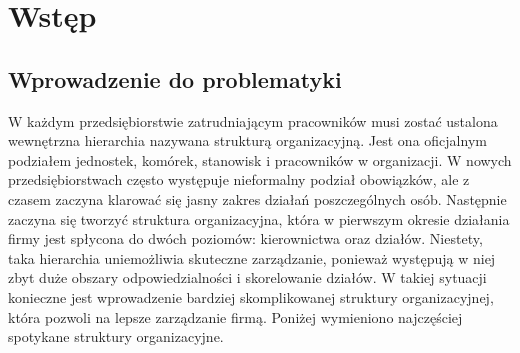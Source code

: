 
\chapter{Wstęp}
\label{ch:wstep}

\section{Wprowadzenie do problematyki}

W każdym przedsiębiorstwie zatrudniającym pracowników musi zostać ustalona wewnętrzna hierarchia nazywana strukturą organizacyjną. Jest ona oficjalnym podziałem jednostek, komórek, stanowisk i pracowników w organizacji. W nowych przedsiębiorstwach często występuje nieformalny podział obowiązków, ale z czasem zaczyna klarować się jasny zakres działań poszczególnych osób. Następnie zaczyna się tworzyć struktura organizacyjna, która w pierwszym okresie działania firmy jest spłycona do dwóch poziomów: kierownictwa oraz działów. Niestety, taka hierarchia uniemożliwia skuteczne zarządzanie, ponieważ występują w niej zbyt duże obszary odpowiedzialności i skorelowanie działów. \cite{bib:zarzadzanie} W takiej sytuacji konieczne jest wprowadzenie bardziej skomplikowanej struktury organizacyjnej, która pozwoli na lepsze zarządzanie firmą. Poniżej wymieniono najczęściej spotykane struktury organizacyjne. \cite{bib:StrukturaOrganizacyjna}

